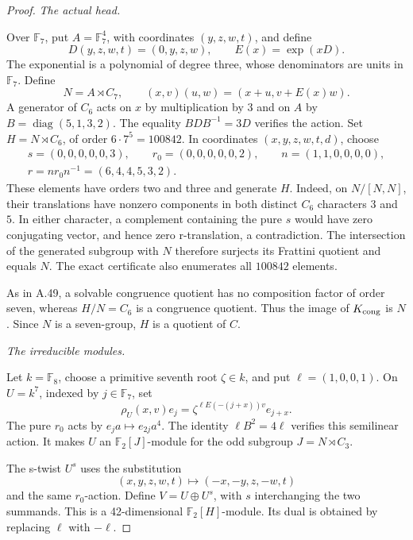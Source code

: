 \begin{proof}
\emph{The actual head.}\par
Over \(\mathbb F_7\), put \(A=\mathbb F_7^4\), with
coordinates \((y,z,w,t)\), and define
\[
 D(y,z,w,t)=(0,y,z,w),\qquad E(x)=\exp(xD).
\]
The exponential is a polynomial of degree three,
whose denominators are units in \(\mathbb F_7\).
Define
\[
 N=A\rtimes C_7,\qquad
 (x,v)(u,w)=(x+u,v+E(x)w).
\]
A generator of \(C_6\) acts on \(x\) by multiplication
by \(3\) and on \(A\) by
\(B=\operatorname{diag}(5,1,3,2)\).
The equality \(BDB^{-1}=3D\) verifies the action.
Set \(H=N\rtimes C_6\), of order \(6\cdot7^5=100842\).
In coordinates \((x,y,z,w,t,d)\), choose
\[
\begin{gathered}
 s=(0,0,0,0,0,3),\qquad r_0=(0,0,0,0,0,2),\qquad
 n=(1,1,0,0,0,0),\\
 r=nr_0n^{-1}=(6,4,4,5,3,2).
\end{gathered}                                       \tag{A.51.2}
\]
These elements have orders two and three and generate
\(H\). Indeed, on \(N/[N,N]\), their translations
have nonzero components in both distinct \(C_6\)
characters \(3\) and \(5\). In either character,
a complement containing the pure \(s\) would have
zero conjugating vector, and hence zero r-translation,
a contradiction. The intersection of the generated
subgroup with \(N\) therefore surjects its Frattini
quotient and equals \(N\). The exact certificate
also enumerates all \(100842\) elements.

As in A.49, a solvable congruence quotient has no
composition factor of order seven, whereas
\(H/N=C_6\) is a congruence quotient. Thus the image
of \(K_{\rm cong}\) is \(N\). Since \(N\) is a
seven-group, \(H\) is a quotient of \(C\).

\emph{The irreducible modules.}\par
Let \(k=\mathbb F_8\), choose a primitive seventh
root \(\zeta\in k\), and put \(\ell=(1,0,0,1)\).
On \(U=k^7\), indexed by \(j\in\mathbb F_7\), set
\[
 \rho_U(x,v)e_j
       =\zeta^{\ell E(-(j+x))v}e_{j+x}.
                                                               \tag{A.51.3}
\]
The pure \(r_0\) acts by
\(e_j a\mapsto e_{2j}a^4\).
The identity \(\ell B^2=4\ell\) verifies this
semilinear action. It makes \(U\) an
\(\mathbb F_2[J]\)-module for the odd subgroup
\(J=N\rtimes C_3\).

The s-twist \(U^s\) uses the substitution
\[
 (x,y,z,w,t)\longmapsto(-x,-y,z,-w,t)
\]
and the same \(r_0\)-action. Define
\(V=U\oplus U^s\), with \(s\) interchanging the
two summands. This is a 42-dimensional
\(\mathbb F_2[H]\)-module. Its dual is obtained
by replacing \(\ell\) with \(-\ell\).


\end{proof}
